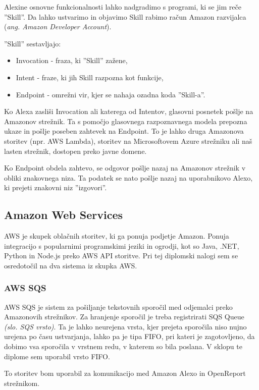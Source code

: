 \documentclass[a4paper, 12pt]{book}
\begin{document}
Alexine osnovne funkcionalnosti lahko nadgradimo s programi, ki se jim reče ''Skill''.
Da lahko ustvarimo in objavimo Skill rabimo račun Amazon razvijalca (\textit{ang. Amazon Developer Account}).


\noindent ''Skill'' sestavljajo:
\begin{itemize}
	\item Invocation - fraza, ki ''Skill'' zažene,
	\item Intent - fraze, ki jih Skill razpozna kot funkcije,
	\item Endpoint - omrežni vir, kjer se nahaja ozadna koda ''Skill-a''.
\end{itemize}

Ko Alexa zasliši Invocation ali katerega od Intentov, glasovni posnetek pošlje na Amazonov strežnik.
Ta s pomočjo glasovnega razpoznavnega modela prepozna ukaze in pošlje poseben zahtevek na Endpoint.
To je lahko druga Amazonova storitev (npr. AWS Lambda), storitev na Microsoftovem Azure strežniku ali naš lasten strežnik, dostopen preko javne domene.

Ko Endpoint obdela zahtevo, se odgovor pošlje nazaj na Amazonov strežnik v obliki znakovnega niza.
Ta podatek se nato pošlje nazaj na uporabnikovo Alexo, ki prejeti znakovni niz ''izgovori''.

\subsection{Amazon Web Services}

AWS je skupek oblačnih storitev, ki ga ponuja podjetje Amazon.
Ponuja integracijo s popularnimi programskimi jeziki in ogrodji, kot so Java, .NET, Python in Node.js preko AWS API storitve.
Pri tej diplomski nalogi sem se osredotočil na dva sistema iz skupka AWS.

\subsubsection{AWS SQS}

AWS SQS je sistem za pošiljanje tekstovnih sporočil med odjemalci preko Amazonovih strežnikov.
Za hranjenje sporočil je treba registrirati SQS Queue \textit{(slo. SQS vrsto)}. 
Ta je lahko neurejena vrsta, kjer prejeta sporočila niso nujno urejena po času ustvarjanja, lahko pa je tipa FIFO, pri kateri je zagotovljeno, da dobimo vsa sporočila v vrstnem redu, v katerem so bila poslana.
V sklopu te diplome sem uporabil vrsto FIFO.

To storitev bom uporabil za komunikacijo med Amazon Alexo in OpenReport strežnikom.
\end{document}
